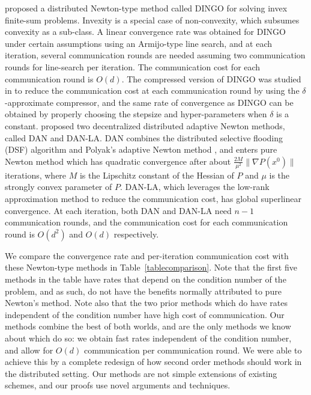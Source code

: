 \documentclass[10pt]{article}
\begin{document}
\citet{DINGO2019} proposed a distributed Newton-type method called DINGO   for solving  invex finite-sum problems. Invexity is a special case of non-convexity, which subsumes convexity as a sub-class. A linear convergence rate was obtained for DINGO under certain assumptions using an Armijo-type line search, and at each iteration, several communication rounds are needed assuming two communication rounds for line-search per iteration. The communication cost for each communication round is $O(d)$. The compressed version of DINGO was studied in \citep{Ghosh2020} to reduce the communication cost at each communication round by using the $\delta$-approximate compressor, and the same rate of convergence as DINGO can be obtained by properly choosing the stepsize and hyper-parameters when $\delta$ is a constant.  \citet{DAN2020} proposed two decentralized distributed adaptive Newton methods, called DAN and DAN-LA. DAN combines the distributed selective flooding (DSF) algorithm and Polyak’s adaptive Newton method \citep{polyak2020new}, and enters pure Newton method which has quadratic convergence after about $\frac{2M}{\mu^2} \|\nabla P(x^0)\|$ iterations, where $M$ is the Lipschitz constant of the Hessian of $P$ and $\mu$ is the strongly convex parameter of $P$. DAN-LA, which leverages the low-rank approximation method to reduce the communication cost, has global superlinear convergence. At each iteration, both DAN and DAN-LA need $n-1$ communication rounds, and the communication cost for each communication round is $O(d^2)$ and $O(d)$ respectively. 

We compare the convergence rate and per-iteration communication cost with these Newton-type methods in Table~\ref{tablecomparison}. Note that the first five methods in the table have rates that depend on the condition number of the problem, and as such, do not have the benefits normally attributed to pure Newton's method. Note also that the two prior methods which do have rates independent of the condition number have high cost of communication. Our methods combine the best of both worlds, and are the only methods we know about which do so: we obtain fast rates independent of the condition number, and allow for $O(d)$ communication per communication round.  We were able to achieve this by a complete redesign of how second order methods should work in the distributed setting. Our methods are not simple extensions of existing schemes, and our proofs use novel arguments and techniques.
\end{document}
